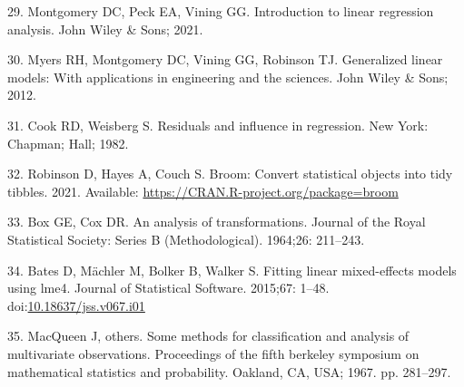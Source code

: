 \documentclass[10pt,letterpaper]{article}
\begin{document}
\leavevmode\hypertarget{ref-montgomery2021introduction}{}%
29. Montgomery DC, Peck EA, Vining GG. Introduction to linear regression
analysis. John Wiley \& Sons; 2021.

\leavevmode\hypertarget{ref-myers2012generalized}{}%
30. Myers RH, Montgomery DC, Vining GG, Robinson TJ. Generalized linear
models: With applications in engineering and the sciences. John Wiley \&
Sons; 2012.

\leavevmode\hypertarget{ref-cook1982residuals}{}%
31. Cook RD, Weisberg S. Residuals and influence in regression. New
York: Chapman; Hall; 1982.

\leavevmode\hypertarget{ref-robinson2021broom}{}%
32. Robinson D, Hayes A, Couch S. Broom: Convert statistical objects
into tidy tibbles. 2021. Available:
\url{https://CRAN.R-project.org/package=broom}

\leavevmode\hypertarget{ref-box1964analysis}{}%
33. Box GE, Cox DR. An analysis of transformations. Journal of the Royal
Statistical Society: Series B (Methodological). 1964;26: 211--243.

\leavevmode\hypertarget{ref-bates2015lme4}{}%
34. Bates D, Mächler M, Bolker B, Walker S. Fitting linear mixed-effects
models using lme4. Journal of Statistical Software. 2015;67: 1--48.
doi:\href{https://doi.org/10.18637/jss.v067.i01}{10.18637/jss.v067.i01}

\leavevmode\hypertarget{ref-macqueen1967some}{}%
35. MacQueen J, others. Some methods for classification and analysis of
multivariate observations. Proceedings of the fifth berkeley symposium
on mathematical statistics and probability. Oakland, CA, USA; 1967. pp.
281--297.

\nolinenumbers
\end{document}
